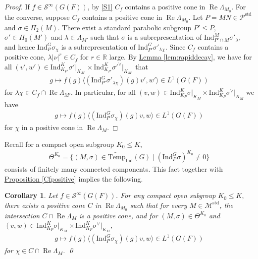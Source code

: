 \documentclass[10pt]{amsart}
\newtheorem{corollary}{Corollary}[theorem]
\theoremstyle{definition}
\numberwithin{equation}{section}
\numberwithin{equation}{subsection}
\newcommand{\Ind}{\mathrm{Ind}}
\newcommand{\RR}{\mathbb{R}}
\newcommand{\Temp}{\mathrm{Temp}}
\renewcommand{\Re}{\mathop{\mathrm{Re}}}
\begin{document}
\begin{proof}
    If $f\in \mathcal{S}^\infty(G(F))$, by \eqref{S1} $C_f$ contains a positive cone in $\Re\Lambda_{M_0}$. For the converse, suppose $C_f$ contains a positive cone in $\Re\Lambda_{M_0}$. Let $P=MN\in \mathcal{P}^{\mathrm{std}}$ and $\sigma\in \Pi_2(M).$ There exist a standard parabolic subgroup $P'\le P,$ $\sigma'\in \Pi_0(M')$ and $\lambda\in \Lambda_{M'}$ such that $\sigma$ is a subrepresentation of $\Ind_{P'\cap M}^{M}\sigma'_\lambda$, and hence $\mathrm{Ind}_{P}^G\sigma_\chi$ is a subrepresentation of $\Ind_{P'}^G\sigma'_{\lambda\chi}.$ Since $C_f$ contains a positive cone, $\lambda|\nu|^r\in C_f$ for $r\in \RR$ large. By \hyperref[lem:rapiddecay]{Lemma \ref{lem:rapiddecay}}, we have for all $(v',w')\in\Ind_{K_{P'} }^K\sigma'\vert_{K_{M'} }\times\Ind_{K_{P'} }^K\sigma'^\vee\vert_{K_{M'}}$ that
    \begin{align*}
    g\mapsto f(g)\langle(\Ind_{P'}^G\sigma'_{\lambda\chi})(g)v',w'\rangle\in L^1(G(F))
    \end{align*} 
    for $\lambda\chi\in C_f\cap \Re\Lambda_{M'}$. In particular, for all $(v,w)\in\Ind_{K_P }^K\sigma\vert_{K_M }\times\Ind_{K_P }^K\sigma^\vee\vert_{K_M}$ we have
    \begin{align*}
    g\mapsto f(g)\langle(\Ind_{P}^G\sigma_{\chi})(g)v,w\rangle\in L^1(G(F))
    \end{align*} 
    for $\chi$ in a positive cone in $\Re \Lambda_M$.
\end{proof}

Recall for a compact open subgroup $K_0\leq K,$
\begin{align*}
    \Theta^{K_0} = \{(M,\sigma)\in\widetilde{\Temp}_\Ind(G)\mid (\Ind_P^G\sigma)^{K_0}\neq 0\}
\end{align*}
consists of finitely many connected components. This fact together with \hyperref[Cfpositive]{Proposition \ref{Cfpositive}} implies the following.

\begin{corollary}\label{cor:Cfpositive}
    Let $f\in \mathcal{S}^\infty(G(F))$. For any compact open subgroup $K_0\leq K,$ there exists a positive cone $C$ in $\Re\Lambda_{M_0}$ such that for every $M\in\mathcal{M}^{\mathrm{std}}$, the intersection $C\cap \Re\Lambda_M$ is a positive cone, and for $(M,\sigma)\in \Theta^{K_0}$ and $(v,w)\in\Ind_{K_P }^K\sigma\vert_{K_M }\times\Ind_{K_P }^K\sigma^\vee\vert_{K_M }$,
\begin{align*}
        g\mapsto f(g)\langle(\Ind_P^G\sigma_\chi)(g)v,w\rangle \in L^1(G(F))
    \end{align*}
for $\chi\in C\cap \Re\Lambda_{M}$. \qed
\end{corollary}
\end{document}
